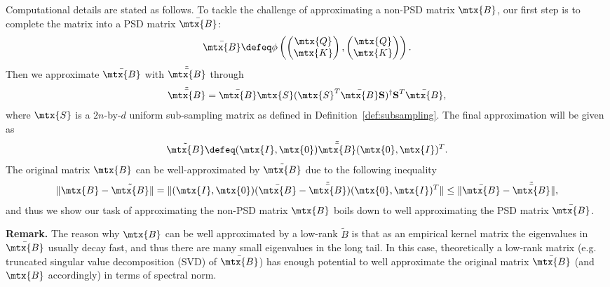 Computational details are stated as follows.
To tackle the challenge of approximating a non-PSD matrix $\mtx{B}$, our first step is to complete the matrix into a PSD matrix $\bar{\mtx{B}}$:
\begin{align}
\label{eqn:concat}
    \bar{\mtx{B}} \defeq \phi \left(
        \begin{pmatrix}
        \mtx{Q}  \\
        \mtx{K} 
        \end{pmatrix},
        \begin{pmatrix}
        \mtx{Q}  \\
        \mtx{K} 
        \end{pmatrix} \right).
\end{align}
Then we approximate $\bar{\mtx{B}}$ with $\tilde{\bar{\mtx{B}}}$ through
\begin{align}
\label{eqn:tilde_bar}
\tilde{\bar{\mtx{B}}} = \bar{\mtx{B}} \mtx{S} (\mtx{S}^{T} \bar{\mtx{B}}\textbf{S})^{\dagger} \textbf{S}^{T}\bar{\mtx{B}},
\end{align}
where $\mtx{S}$ is a $2n$-by-$d$ uniform sub-sampling matrix as defined in Definition~\ref{def:subsampling}.
The final approximation will be given as 
\begin{align}
\label{eqn:approx}
\tilde{\mtx{B}} \defeq (\mtx{I}, \mtx{0}) \tilde{\bar{\mtx{B}}} (\mtx{0}, \mtx{I})^T.
\end{align}
The original matrix $\mtx{B}$ can be well-approximated by $\tilde{\mtx{B}}$ due to the following inequality
\begin{align*}
\|\mtx{B} - \tilde{\mtx{B}}\| = \|(\mtx{I}, \mtx{0}) (\bar{\mtx{B}} - \tilde{\bar{\mtx{B}}}) (\mtx{0}, \mtx{I})^T\| \leq \|\bar{\mtx{B}} - \tilde{\bar{\mtx{B}}}\|,
\end{align*}
and thus we show our task of approximating the non-PSD matrix $\mtx{B}$ boils down to well approximating the PSD matrix $\bar{\mtx{B}}$.


\textbf{Remark.} 
The reason why $\mtx{B}$ can be well approximated by a low-rank $\tilde{B}$ is that as an empirical kernel matrix the eigenvalues in $\bar{\mtx{B}}$ usually decay fast,
and thus there are many small eigenvalues in the long tail. 
In this case, theoretically a low-rank matrix (e.g. truncated singular value decomposition (SVD) of $\bar{\mtx{B}}$) has enough potential to well approximate the original matrix $\bar{\mtx{B}}$ (and $\mtx{B}$ accordingly) in terms of spectral norm.
% 


